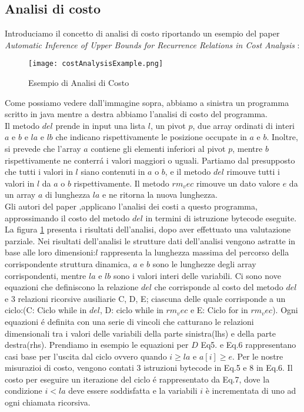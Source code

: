 \documentclass[../../main.tex]{subfiles}
\begin{document}
\subsection{Analisi di costo}
Introduciamo il concetto di analisi di costo riportando un esempio del paper \textit{Automatic Inference of Upper Bounds for Recurrence Relations in Cost Analysis} \autocite{albert2008automatic}:
\begin{figure}[H]
    \centering
    \texttt{[image: costAnalysisExample.png]}
    \caption{Esempio di Analisi di Costo}
    \label{fig:costAnalysisExample}
\end{figure}
Come possiamo vedere dall'immagine sopra, abbiamo a sinistra un programma scritto in java mentre a destra abbiamo l'analisi di costo del programma.\\
Il metodo $del$ prende in input una lista $l$, un pivot $p$, due array ordinati di interi $a$ e $b$ e $la$ e $lb$ che indicano rispettivamente le posizione occupate in $a$ e $b$.
Inoltre, si prevede che l'array $a$ contiene gli elementi inferiori al pivot $p$, mentre $b$ rispettivamente ne conterrá i valori maggiori o uguali.
Partiamo dal presupposto che tutti i valori in $l$ siano contenuti in $a$ o $b$, e il metodo $del$ rimouve tutti i valori in $l$ da $a$ o $b$ rispettivamente.
Il metodo $rm_vec$ rimouve un dato valore $e$ da un array $a$ di lunghezza $la$ e ne ritorna la nuova lunghezza.\\
Gli autori del paper \autocite{albert2008automatic},applicano l'analisi dei costi a questo programma, approssimando il costo del metodo $del$ in termini di istruzione bytecode eseguite.\\
La figura \ref{fig:costAnalysisExample} presenta i risultati dell'analisi, dopo aver effettuato una valutazione parziale.
Nei risultati dell'analisi le strutture dati dell'analisi vengono astratte in base alle loro dimensioni:$l$ rappresenta la lunghezza massima del percorso della corrispondente struttura dinamica, $a$ e $b$ sono le lunghezze degli array corrispondenti, mentre $la$ e $lb$ sono i valori interi delle variabili.
Ci sono nove equazioni che definiscono la relazione $ del $ che corrisponde al costo del metodo $del$ e 3 relazioni ricorsive ausiliarie C, D, E; ciascuna delle quale corrisponde a un ciclo:(C: Ciclo while in $del$, D: ciclo while in $rm_vec$ e E: Ciclo for in $rm_vec$).
Ogni equazioni é definita con una serie di vincoli che catturano le relazioni dimensionali tra i valori delle variabili della parte sinistra(lhs) e della parte destra(rhs).
Prendiamo in esempio le equazioni per $D$ Eq5. e Eq.6 rappresentano casi base per l'uscita dal ciclo ovvero quando $i \geq la$ e $a[i]\geq e$.
Per le nostre misurazioi di costo, vengono contati 3 istruzioni bytecode in Eq.5 e 8 in Eq.6.
Il costo per eseguire un iterazione del ciclo é rappresentato da Eq.7, dove la condizione $i < la$ deve essere soddisfatta e la variabili $i$ è incrementata di uno ad ogni chiamata ricorsiva.
\end{document}
